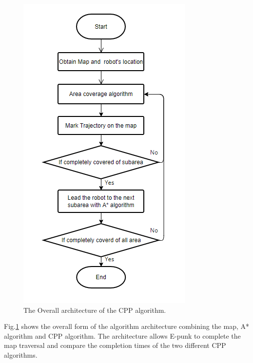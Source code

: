 \documentclass[conference]{IEEEtran}
\begin{document}
\begin{figure}[htbp]
\setlength{\belowcaptionskip}{-1cm}
\centerline{\includegraphics[scale=0.6]{RS_Report/The Overall architecture of the CPP algorithm.png}}
\caption{The Overall architecture of the CPP algorithm.}
\label{fig3}
\end{figure}

Fig.\ref{fig3} shows the overall form of the algorithm architecture combining the map, A* algorithm and CPP algorithm. The architecture allows E-punk to complete the map traversal and compare the completion times of the two different CPP algorithms. 
\end{document}

